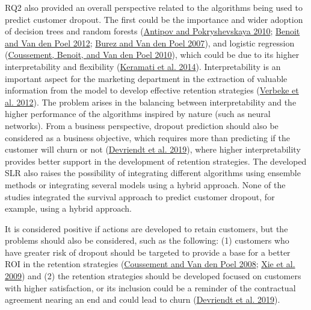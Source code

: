 \documentclass[
  12pt,
]{article}
\begin{document}
RQ2 also provided an overall perspective related to the algorithms being used to
predict customer dropout. The first could be the importance and wider adoption
of decision trees and random forests (\protect\hyperlink{ref-antipov_applying_2010}{Antipov and Pokryshevskaya 2010}; \protect\hyperlink{ref-benoit_improving_2012}{Benoit and Van den Poel 2012}; \protect\hyperlink{ref-burez_crm_2007}{Burez and Van den Poel 2007}), and logistic regression
(\protect\hyperlink{ref-coussement_improved_2010}{Coussement, Benoit, and Van den Poel 2010}), which could be due to its higher interpretability
and flexibility (\protect\hyperlink{ref-keramati_improved_2014}{Keramati et al. 2014}). Interpretability is an important
aspect for the marketing department in the extraction of valuable information
from the model to develop effective retention strategies (\protect\hyperlink{ref-verbeke_new_2012}{Verbeke et al. 2012}).
The problem arises in the balancing between interpretability and the higher
performance of the algorithms inspired by nature (such as neural networks). From
a business perspective, dropout prediction should also be considered as a
business objective, which requires more than predicting if the customer will
churn or not (\protect\hyperlink{ref-devriendt_why_2019}{Devriendt et al. 2019}), where higher interpretability provides
better support in the development of retention strategies. The developed SLR
also raises the possibility of integrating different algorithms using ensemble
methods or integrating several models using a hybrid approach. None of the
studies integrated the survival approach to predict customer dropout, for
example, using a hybrid approach.

It is considered positive if actions are developed to retain customers, but the
problems should also be considered, such as the following: (1) customers who
have greater risk of dropout should be targeted to provide a base for a better
ROI in the retention strategies (\protect\hyperlink{ref-coussement_churn_2008}{Coussement and Van den Poel 2008}; \protect\hyperlink{ref-xie_customer_2009}{Xie et al. 2009}) and
(2) the retention strategies should be developed focused on customers with
higher satisfaction, or its inclusion could be a reminder of the contractual
agreement nearing an end and could lead to churn (\protect\hyperlink{ref-devriendt_why_2019}{Devriendt et al. 2019}).
\end{document}
